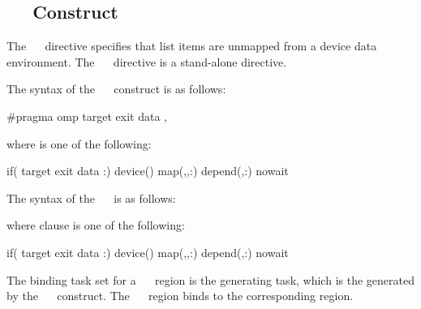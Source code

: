 \subsection{~~ Construct}
\label{subsec:target exit data Construct}
\summary
The ~~ directive specifies that list items are unmapped from a device data environment. The ~~ directive is a stand-alone directive.
\syntax
\begin{ccppspecific}
The syntax of the ~~ construct is as follows:
\begin{ompcPragma}
#pragma omp target exit data \plc{[ clause[ [},\plc{] clause]...] new-line}
\end{ompcPragma}
where  is one of the following:
\begin{indentedcodelist}
if(\plc{[} target exit data :\plc{] scalar-expression})
device()
map(\plc{[map-type-modifier[},\plc{] [map-type-modifier[},\plc{] ...] map-type}:)
depend(\plc{[depend-modifier},\plc{] dependence-type }:)
nowait
\end{indentedcodelist}
\end{ccppspecific}
\begin{fortranspecific}
The syntax of the ~~ is as follows:
where clause is one of the following:
\begin{indentedcodelist}
if(\plc{[} target exit data :\plc{] scalar-logical-expression})
device()
map(\plc{[map-type-modifier[},\plc{] [map-type-modifier[},\plc{] ...] map-type}:)
depend(\plc{[depend-modifier},\plc{] dependence-type }:)
nowait
\end{indentedcodelist}
\end{fortranspecific}

\binding
The binding task set for a ~~ region is
the generating task, which is the  generated by the
~~ construct. The
~~ region binds to the corresponding
 region.

